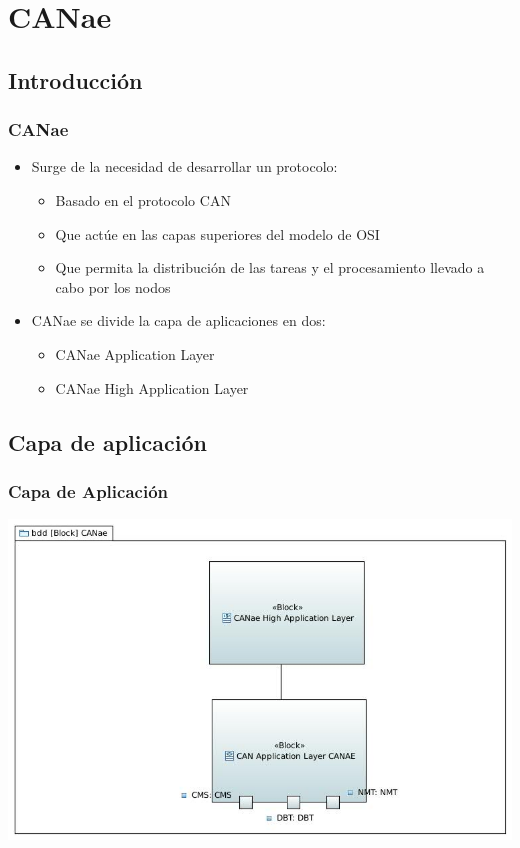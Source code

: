 \section{CANae}
\subsection{Introducción}
\begin{frame}
	\frametitle{CANae}
	\begin{itemize}
		\item Surge de la necesidad de desarrollar un protocolo:
		\begin{itemize}
			\item Basado en el protocolo CAN
			\item Que actúe en las capas superiores del modelo de OSI
			\item Que permita la distribución de las tareas y el procesamiento llevado a cabo por los nodos
		\end{itemize}
		\item CANae se divide la capa de aplicaciones en dos:
		\begin{itemize}
			\item CANae Application Layer
			\item CANae High Application Layer
		\end{itemize}
	\end{itemize}
\end{frame}

\subsection{Capa de aplicación}
\begin{frame}
	\frametitle{Capa de Aplicación}
	\centering
	\includegraphics[scale=0.4]{images/CANAE.JPG}
\end{frame}


